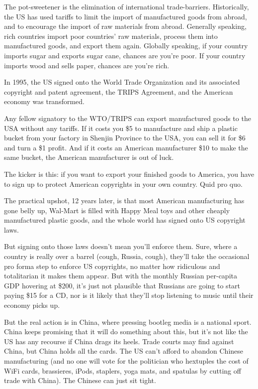 The pot-sweetener is the elimination of international
trade-barriers. Historically, the US has used tariffs to limit the
import of manufactured goods from abroad, and to encourage the
import of raw materials from abroad. Generally speaking, rich
countries import poor countries' raw materials, process them into
manufactured goods, and export them again. Globally speaking, if
your country imports sugar and exports sugar cane, chances are
you're poor. If your country imports wood and sells paper, chances
are you're rich.

In 1995, the US signed onto the World Trade Organization and its
associated copyright and patent agreement, the TRIPS Agreement, and
the American economy was transformed.

Any fellow signatory to the WTO/TRIPS can export manufactured goods
to the USA without any tariffs. If it costs you \$5 to manufacture
and ship a plastic bucket from your factory in Shenjin Province to
the USA, you can sell it for \$6 and turn a \$1 profit. And if it
costs an American manufacturer \$10 to make the same bucket, the
American manufacturer is out of luck.

The kicker is this: if you want to export your finished goods to
America, you have to sign up to protect American copyrights in your
own country. Quid pro quo.

The practical upshot, 12 years later, is that most American
manufacturing has gone belly up, Wal-Mart is filled with Happy Meal
toys and other cheaply manufactured plastic goods, and the whole
world has signed onto US copyright laws.

But signing onto those laws doesn't mean you'll enforce them. Sure,
where a country is really over a barrel (cough, Russia, cough),
they'll take the occasional pro forma step to enforce US
copyrights, no matter how ridiculous and totalitarian it makes them
appear. But with the monthly Russian per-capita GDP hovering at
\$200, it's just not plausible that Russians are going to start
paying \$15 for a CD, nor is it likely that they'll stop listening
to music until their economy picks up.

But the real action is in China, where pressing bootleg media is a
national sport. China keeps promising that it will do something
about this, but it's not like the US has any recourse if China
drags its heels. Trade courts may find against China, but China
holds all the cards. The US can't afford to abandon Chinese
manufacturing (and no one will vote for the politician who
hextuples the cost of WiFi cards, brassieres, iPods, staplers, yoga
mats, and spatulas by cutting off trade with China). The Chinese
can just sit tight.

